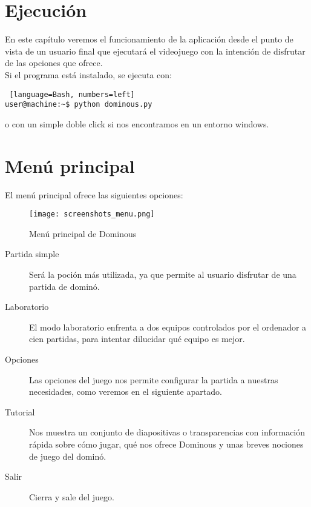 



\section{Ejecución}

En este capítulo veremos el funcionamiento de la aplicación desde el punto de vista de un usuario final que ejecutará el
videojuego con la intención de disfrutar de las opciones que ofrece. \\

Si el programa está instalado, se ejecuta con:

\begin{lstlisting} [language=Bash, numbers=left]
user@machine:~$ python dominous.py
\end{lstlisting}

o con un simple doble click si nos encontramos en un entorno windows. \\

\section{Menú principal}

El menú principal ofrece las siguientes opciones:

\begin{figure}[h]
  \label{screenshots_menu}
  \begin{center}
    \texttt{[image: screenshots\_menu.png]}
  \end{center}
  \caption{Menú principal de Dominous}
\end{figure}

\begin{description}
    \item[Partida simple] Será la poción más utilizada, ya que permite al usuario disfrutar de una partida de dominó.
    \item[Laboratorio] El modo laboratorio enfrenta a dos equipos controlados por el ordenador a cien partidas, para
            intentar dilucidar qué equipo es mejor.
    \item[Opciones] Las opciones del juego nos permite configurar la partida a nuestras necesidades, como veremos en el
            siguiente apartado.
    \item[Tutorial] Nos muestra un conjunto de diapositivas o transparencias con información rápida sobre cómo jugar,
            qué nos ofrece Dominous y unas breves nociones de juego del dominó.
    \item[Salir] Cierra y sale del juego.
\end{description}

